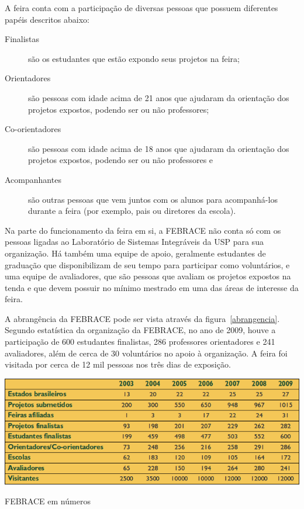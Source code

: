  A feira conta com a participação de diversas pessoas que possuem diferentes papéis descritos abaixo:

  \begin{description}
    \item[Finalistas] 
        são os estudantes que estão expondo seus projetos na feira;
    \item[Orientadores] 
        são pessoas com idade acima de 21 anos que ajudaram da orientação dos projetos expostos, podendo ser ou não professores;
    \item[Co-orientadores] 
        são pessoas com idade acima de 18 anos que ajudaram da orientação dos projetos expostos, podendo ser ou não professores e
    \item[Acompanhantes] 
        são outras pessoas que vem juntos com os alunos para acompanhá-los durante a feira (por exemplo, pais ou diretores da escola).
  \end{description}

 Na parte do funcionamento da feira em si, a FEBRACE não conta só com os pessoas ligadas ao Laboratório de Sistemas Integráveis da USP para sua organização. Há também uma equipe de apoio, geralmente estudantes de graduação que disponibilizam de seu tempo para participar como voluntários, e uma equipe de avaliadores, que são pessoas que avaliam os projetos expostos na tenda e que devem possuir no mínimo mestrado em uma das áreas de interesse da feira.

 A abrangência da FEBRACE pode ser vista através da figura~\ref{abrangencia}. Segundo estatística da organização da FEBRACE, no ano de 2009, houve a participação de 600 estudantes finalistas, 286 professores orientadores e 241 avaliadores, além de cerca de 30 voluntários no apoio à organização. A feira foi visitada por cerca de 12 mil pessoas nos três dias de exposição. 

    \begin{table}
        \begin{center}
    \includegraphics[width=0.8\linewidth]{arquivos/abrangencia.png}
        \end{center}
        \caption{FEBRACE em números}
        \label{abrangencia}
    \end{table}


